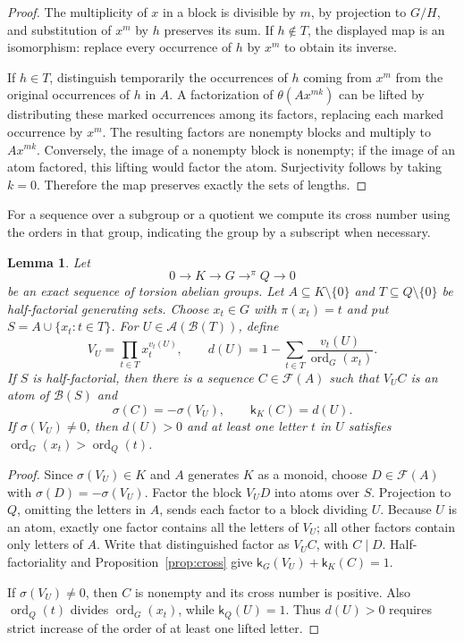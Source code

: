 \documentclass[11pt,reqno]{amsart}
\numberwithin{equation}{section}
\newtheorem{lemma}[theorem]{Lemma}
\theoremstyle{definition}
\theoremstyle{remark}
\newcommand{\B}{\mathcal B}
\newcommand{\F}{\mathcal F}
\newcommand{\A}{\mathcal A}
\DeclareMathOperator{\ord}{ord}
\begin{document}
\begin{proof}
The multiplicity of $x$ in a block is divisible by $m$, by
projection to $G/H$, and substitution of $x^m$ by $h$ preserves
its sum. If $h\notin T$, the displayed map is an isomorphism:
replace every occurrence of $h$ by $x^m$ to obtain its inverse.

If $h\in T$, distinguish temporarily the occurrences of $h$
coming from $x^m$ from the original occurrences of $h$ in $A$.
A factorization of $\theta(Ax^{mk})$ can be lifted by distributing
these marked occurrences among its factors, replacing each marked
occurrence by $x^m$. The resulting factors are nonempty blocks
and multiply to $Ax^{mk}$. Conversely, the image of a nonempty
block is nonempty; if the image of an atom factored, this lifting
would factor the atom. Surjectivity follows by taking $k=0$.
Therefore the map preserves exactly the sets of lengths.
\end{proof}

For a sequence over a subgroup or a quotient we compute its cross
number using the orders in that group, indicating the group by a
subscript when necessary.

\begin{lemma}\label{lem:defect}
Let
\[
 0\longrightarrow K\longrightarrow G
   \mathrel{\mathop{\longrightarrow}^{\pi}} Q
   \longrightarrow0
\]
be an exact sequence of torsion abelian groups. Let
$A\subseteq K\setminus\{0\}$ and
$T\subseteq Q\setminus\{0\}$ be half-factorial generating sets.
Choose $x_t\in G$ with $\pi(x_t)=t$ and put
$S=A\cup\{x_t:t\in T\}$. For
$U\in\A(\B(T))$, define
\[
 V_U=\prod_{t\in T}x_t^{v_t(U)},\qquad
 d(U)=1-\sum_{t\in T}\frac{v_t(U)}{\ord_G(x_t)}.
\]
If $S$ is half-factorial, then there is a sequence $C\in\F(A)$
such that $V_UC$ is an atom of $\B(S)$ and
\begin{equation}\label{eq:defect}
 \sigma(C)=-\sigma(V_U),\qquad \mathsf k_K(C)=d(U).
\end{equation}
If $\sigma(V_U)\ne0$, then $d(U)>0$ and at least one letter
$t$ in $U$ satisfies $\ord_G(x_t)>\ord_Q(t)$.
\end{lemma}

\begin{proof}
Since $\sigma(V_U)\in K$ and $A$ generates $K$ as a monoid,
choose $D\in\F(A)$ with $\sigma(D)=-\sigma(V_U)$. Factor the
block $V_UD$ into atoms over $S$. Projection to $Q$, omitting
the letters in $A$, sends each factor to a block dividing $U$.
Because $U$ is an atom, exactly one factor contains all the
letters of $V_U$; all other factors contain only letters of
$A$. Write that distinguished factor as $V_UC$, with $C\mid D$.
Half-factoriality and Proposition~\ref{prop:cross} give
$\mathsf k_G(V_U)+\mathsf k_K(C)=1$.

If $\sigma(V_U)\ne0$, then $C$ is nonempty and its cross number
is positive. Also $\ord_Q(t)$ divides $\ord_G(x_t)$, while
$\mathsf k_Q(U)=1$. Thus $d(U)>0$ requires strict increase of
the order of at least one lifted letter.
\end{proof}
\end{document}
